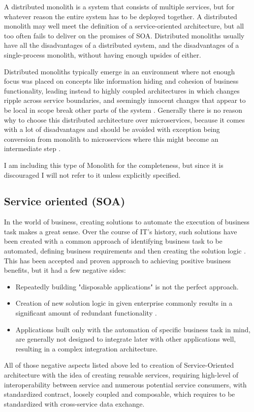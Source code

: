 A distributed monolith is a system that consists of multiple services, but for whatever reason the entire system has to be deployed together. A distributed monolith may well meet the definition of a service-oriented architecture, but all too often fails to deliver on the promises of SOA. Distributed monoliths usually have all the disadvantages of a distributed system, and the disadvantages of a single-process monolith, without having enough upsides of either. \cite{MON_TO_MS_MONOLITH}

Distributed monoliths typically emerge in an environment where not enough focus was placed on concepts like information hiding and cohesion of business functionality, leading instead to highly coupled architectures in which changes ripple across service boundaries, and seemingly innocent changes that appear to be local in scope break other parts of the system \cite{MON_TO_MS_MONOLITH}. Generally there is no reason why to choose this distributed architecture over microservices, because it comes with a lot of disadvantages and should be avoided with exception being conversion from monolith to microservices where this might become an intermediate step \cite{DIST_MON_WHICH_BUILDING}.

I am including this type of Monolith for the completeness, but since it is discouraged I will not refer to it unless explicitly specified.

\subsection{Service oriented (SOA)}
In the world of business, creating solutions to automate the execution of business task makes a great sense. Over the course of IT's history, such solutions have been created with a common approach of identifying business task to be automated, defining business requirements and then creating the solution logic \cite{SERVICE_ORIENTED_ARCHITECTURE}. This has been accepted and proven approach to achieving positive business benefits, but it had a few negative sides:
\begin{itemize}
    \item  Repeatedly building "disposable applications" is not the perfect approach.
    \item  Creation of new solution logic in given enterprise commonly results in a significant amount of redundant functionality \cite{SERVICE_ORIENTED_ARCHITECTURE}.
    \item Applications built only with the automation of specific business task in mind, are generally not designed to integrate later with other applications well, resulting in a complex integration architecture.
\end{itemize}
All of those negative aspects listed above led to creation of Service-Oriented architecture with the idea of creating reusable services, requiring high-level of interoperability between service and numerous potential service consumers, with standardized contract, loosely coupled and composable, which requires to be standardized with cross-service data exchange.

